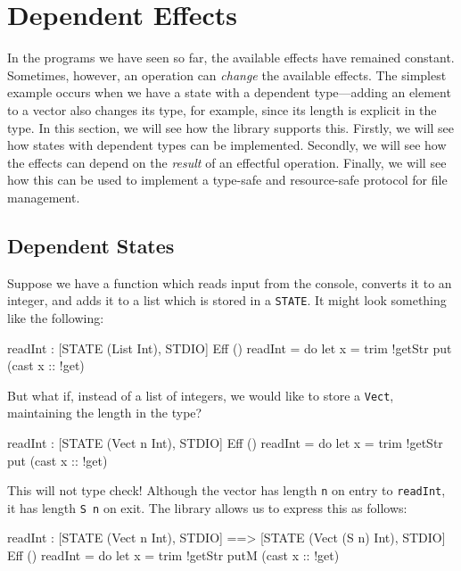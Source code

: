 \section{Dependent Effects}

\label{sect:depeff}

In the programs we have seen so far, the available effects have remained
constant. Sometimes, however, an operation can \emph{change} the available
effects. The simplest example occurs when we have a state with a dependent
type---adding an element to a vector also changes its type, for example,
since its length is explicit in the type. In this section, we will see how
the \effects{} library supports this. Firstly, we will see how states with
dependent types can be implemented. Secondly, we will see how the effects
can depend on the \emph{result} of an effectful operation. Finally, we will
see how this can be used to implement a type-safe and resource-safe protocol
for file management.

\subsection{Dependent States}

Suppose we have a function which reads input from the console, converts it
to an integer, and adds it to a list which is stored in a \texttt{STATE}.
It might look something like the following:

\begin{code}
readInt : { [STATE (List Int), STDIO] } Eff ()
readInt = do let x = trim !getStr
             put (cast x :: !get)
\end{code}

\noindent
But what if, instead of a list of integers, we would like to store a
\texttt{Vect}, maintaining the length in the type?

\begin{code}
readInt : { [STATE (Vect n Int), STDIO] } Eff ()
readInt = do let x = trim !getStr
             put (cast x :: !get)
\end{code}

\noindent
This will not type check! Although the vector has length \texttt{n} on
entry to \texttt{readInt}, it has length \texttt{S n} on exit. The
\effects{} library allows us to express this as follows:

\begin{code}
readInt : { [STATE (Vect n Int), STDIO] ==>
            [STATE (Vect (S n) Int), STDIO] } Eff ()
readInt = do let x = trim !getStr
             putM (cast x :: !get)
\end{code}

